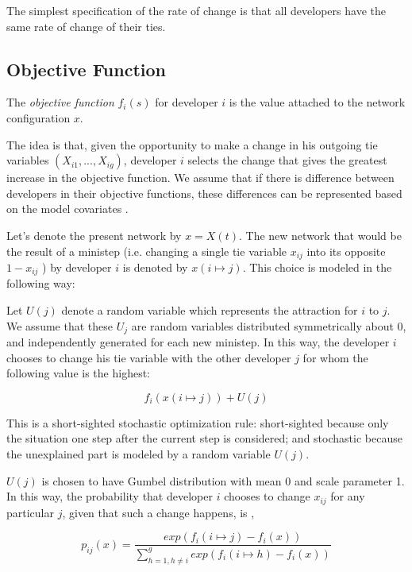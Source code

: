 \documentclass[12pt,letterpaper]{gthesis2}  %
\begin{document}
The simplest specification of the rate of change is that all developers have the same rate of change of their ties. 

\subsection*{Objective Function}

The \textit{objective function} $f_i(s)$ for developer $i$ is the value attached to the network configuration $x$. 

The idea is that, given the opportunity to make a change in his outgoing tie variables $(X_{i1},...,X_{ig})$, developer $i$ selects the change that gives the greatest increase in the objective function. We assume that if there is difference between developers in their objective functions, these differences can be represented based on the model covariates \cite{Snijders2004}. 

Let's denote the present network by $x = X(t)$. The new network that would be the result of a ministep (i.e. changing a single tie variable $x_{ij}$ into its opposite $1 - x_{ij}$ ) by developer $i$ is denoted by $x(i \mapsto j)$. This choice is modeled in the following way: 

Let $U(j)$ denote a random variable which represents the attraction for $i$ to $j$. We assume that these $U_j$ are random variables distributed symmetrically about 0, and independently generated for each new ministep. In this way, the developer $i$ chooses to change his tie variable with the other developer $j$ for whom the following value \cite{Snijders2004} is the highest:

\begin{equation}
f_i(x(i \mapsto j)) + U(j)
\end{equation} 

This is a short-sighted stochastic optimization rule: short-sighted because only the situation one step after the current step is considered; and stochastic because the unexplained part is modeled by a random variable $U(j)$. 

$U(j)$ is chosen to have Gumbel distribution with mean 0 and scale parameter 1. In this way, the probability that developer $i$ chooses to change $x_{ij}$ for any particular $j$, given that such a change happens, is \cite{Snijders2004},

\begin{equation}
p_{ij}(x) = \frac{exp(f_i(i \mapsto j) - f_i(x))}{\sum_{h=1, h \neq i}^{g} exp(f_i(i \mapsto h) - f_i(x))}
\end{equation}
\end{document}
